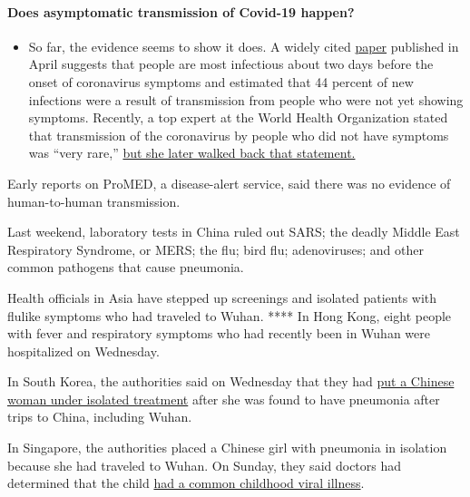 \begin{itemize}
{  \paragraph{Does asymptomatic transmission of Covid-19
  happen?}\label{does-asymptomatic-transmission-of-covid-19-happen}}

  \begin{itemize}
  \tightlist
  \item
    So far, the evidence seems to show it does. A widely cited
    \href{https://www.nature.com/articles/s41591-020-0869-5}{paper}
    published in April suggests that people are most infectious about
    two days before the onset of coronavirus symptoms and estimated that
    44 percent of new infections were a result of transmission from
    people who were not yet showing symptoms. Recently, a top expert at
    the World Health Organization stated that transmission of the
    coronavirus by people who did not have symptoms was ``very rare,''
    \href{https://www.nytimes3xbfgragh.onion/2020/06/09/world/coronavirus-updates.html?action=click\&pgtype=Article\&state=default\&region=MAIN_CONTENT_3\&context=storylines_faq\#link-1f302e21}{but
    she later walked back that statement.}
  \end{itemize}
\end{itemize}

Early reports on ProMED, a disease-alert service, said there was no
evidence of human-to-human transmission.

Last weekend, laboratory tests in China ruled out SARS; the deadly
Middle East Respiratory Syndrome, or MERS; the flu; bird flu;
adenoviruses; and other common pathogens that cause pneumonia.

Health officials in Asia have stepped up screenings and isolated
patients with flulike symptoms who had traveled to Wuhan. **** In Hong
Kong, eight people with fever and respiratory symptoms who had recently
been in Wuhan were hospitalized on Wednesday.

In South Korea, the authorities said on Wednesday that they had
\href{https://www.scmp.com/news/asia/east-asia/article/3045249/chinese-worker-who-visited-wuhan-quarantined-south-korea}{put
a Chinese woman under isolated treatment} after she was found to have
pneumonia after trips to China, including Wuhan.

In Singapore, the authorities placed a Chinese girl with pneumonia in
isolation because she had traveled to Wuhan. On Sunday, they said
doctors had determined that the child
\href{https://www.moh.gov.sg/news-highlights/details/update-on-local-situation-regarding-severe-pneumonia-cluster-in-wuhan-5-jan}{had
a common childhood viral illness}.

